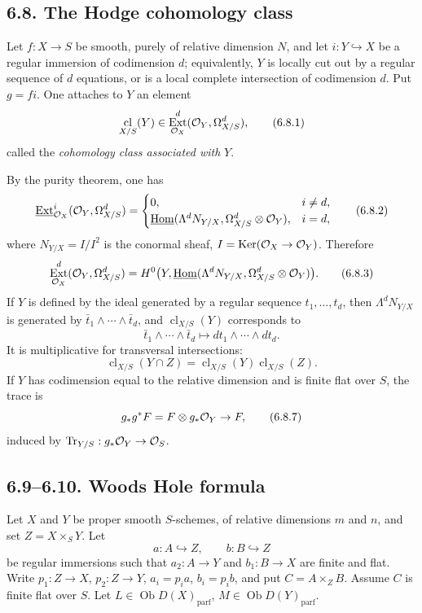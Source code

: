 \documentclass[11pt]{article}
\theoremstyle{plain}
\theoremstyle{definition}
\theoremstyle{remark}
\DeclareMathOperator{\Hom}{Hom}
\DeclareMathOperator{\Ext}{Ext}
\DeclareMathOperator{\Ker}{Ker}
\DeclareMathOperator{\ob}{Ob}
\DeclareMathOperator{\Tr}{Tr}
\DeclareMathOperator{\cl}{cl}
\begin{document}
\subsection*{6.8. The Hodge cohomology class}
Let $f:X\to S$ be smooth, purely of relative dimension $N$, and let $i:Y\hookrightarrow X$ be a regular immersion of codimension $d$; equivalently, $Y$ is locally cut out by a regular sequence of $d$ equations, or is a local complete intersection of codimension $d$. Put $g=fi$. One attaches to $Y$ an element
\begin{equation}
   \cl_{X/S}(Y)\in\Ext^d_{\cO_X}(\cO_Y,\Omega^d_{X/S}),
   \tag{6.8.1}
\end{equation}
called the \emph{cohomology class associated with} $Y$.

By the purity theorem, one has
\begin{equation}
\underline{\Ext}^{i}_{\cO_X}(\cO_Y,\Omega^d_{X/S})=
\begin{cases}
0, & i\ne d,\\
\underline{\Hom}(\Lambda^dN_{Y/X},\Omega^d_{X/S}\otimes\cO_Y), & i=d,
\end{cases}
\tag{6.8.2}
\end{equation}
where $N_{Y/X}=I/I^2$ is the conormal sheaf, $I=\Ker(\cO_X\to\cO_Y)$. Therefore
\begin{equation}
\Ext^d_{\cO_X}(\cO_Y,\Omega^d_{X/S})=
H^0\bigl(Y,\underline{\Hom}(\Lambda^dN_{Y/X},\Omega^d_{X/S}\otimes\cO_Y)\bigr).
\tag{6.8.3}
\end{equation}
If $Y$ is defined by the ideal generated by a regular sequence $t_1,\ldots,t_d$, then $\Lambda^dN_{Y/X}$ is generated by $\bar t_1\wedge\cdots\wedge\bar t_d$, and $\cl_{X/S}(Y)$ corresponds to
\begin{equation}
   \bar t_1\wedge\cdots\wedge\bar t_d
   \longmapsto dt_1\wedge\cdots\wedge dt_d.
   \tag{6.8.5}
\end{equation}
It is multiplicative for transversal intersections:
\begin{equation}
   \cl_{X/S}(Y\cap Z)=\cl_{X/S}(Y)\cl_{X/S}(Z).
   \tag{6.8.6}
\end{equation}
If $Y$ has codimension equal to the relative dimension and is finite flat over $S$, the trace is
\begin{equation}
   g_*g^*F=F\otimes g_*\mathcal O_Y\to F,
   \tag{6.8.7}
\end{equation}
induced by $\Tr_{Y/S}:g_*\cO_Y\to\cO_S$.

\subsection*{6.9--6.10. Woods Hole formula}
Let $X$ and $Y$ be proper smooth $S$-schemes, of relative dimensions $m$ and $n$, and set $Z=X\times_SY$. Let
\[
   a:A\hookrightarrow Z,
   \qquad
   b:B\hookrightarrow Z
\]
be regular immersions such that $a_2:A\to Y$ and $b_1:B\to X$ are finite and flat. Write $p_1:Z\to X$, $p_2:Z\to Y$, $a_i=p_ia$, $b_i=p_ib$, and put $C=A\times_ZB$. Assume $C$ is finite flat over $S$. Let $L\in\ob D(X)_{\mathrm{parf}}$, $M\in\ob D(Y)_{\mathrm{parf}}$.
\end{document}
